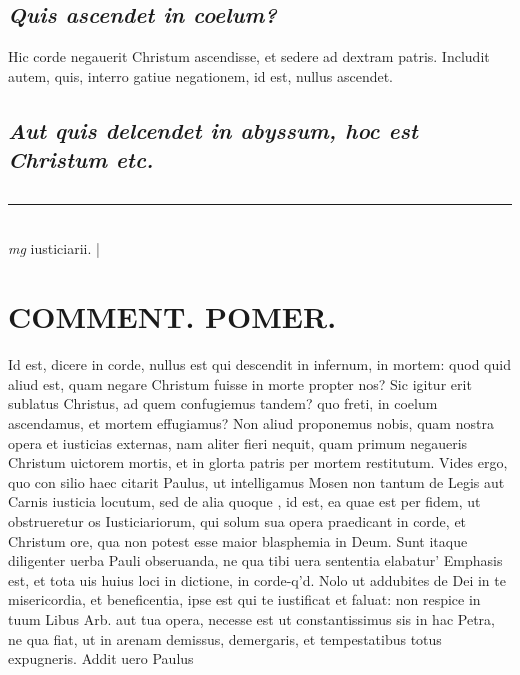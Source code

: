 \documentclass{article}
\begin{document}
\begin{pages}
\subsection*{\textit{Quis ascendet in coelum? }}\pstart Hic corde negauerit Christum ascendisse, et sedere ad dextram patris. Includit autem, quis, interro gatiue negationem, id est, nullus ascendet.   \pend
{}
{}
\subsection*{\textit{Aut quis delcendet in abyssum, hoc est Christum etc. }}
{}
\subsection*{\textit{}}\pstart  \pend
\vspace{0.5cm}\noindent
\vspace{0.2cm}\rule{1cm}{0.2pt}\\ 
\hspace{0.2cm}\textit{mg}
\footnotesize iusticiarii.  
\normalsize| 
\section*{COMMENT. POMER.  }\pstart Id est, dicere in corde, nullus est qui descendit in infernum, in mortem: quod quid aliud est, quam negare Christum fuisse in morte propter nos? Sic igitur erit sublatus Christus, ad quem confugiemus tandem? quo freti, in coelum ascendamus, et mortem effugiamus? Non aliud proponemus nobis, quam nostra opera et iusticias externas, nam aliter fieri nequit, quam primum negaueris Christum uictorem mortis, et in glorta patris per mortem restitutum. Vides ergo, quo con silio haec citarit Paulus, ut intelligamus Mosen non tantum de Legis aut Carnis iusticia locutum, sed de alia quoque , id est, ea quae est per fidem, ut obstrueretur os Iusticiariorum, qui solum sua opera praedicant in corde, et Christum ore, qua non potest esse maior blasphemia in Deum. Sunt itaque diligenter uerba Pauli obseruanda, ne qua tibi uera sententia elabatur' Emphasis est, et tota uis huius loci in dictione, in corde-q'd. Nolo ut addubites de Dei in te misericordia, et beneficentia, ipse est qui te iustificat et faluat: non respice in tuum Libus Arb. aut tua opera, necesse est ut constantissimus sis in hac Petra, ne qua fiat, ut in arenam demissus, demergaris, et tempestatibus totus expugneris. Addit uero Paulus  \pend
{}
{}

\end{pages}
\end{document}
